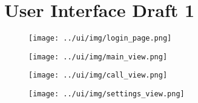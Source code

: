 \chapter{User Interface Draft 1}
\begin{landscape}
	\begin{figure}[H]
		\centering
		\texttt{[image: ../ui/img/login\_page.png]}
		\label{login screen}
	\end{figure}
	\begin{figure}[H]
		\centering
		\texttt{[image: ../ui/img/main\_view.png]}
		\label{main screen}
	\end{figure}
	\begin{figure}[H]
		\centering
		\texttt{[image: ../ui/img/call\_view.png]}
		\label{call screen}
	\end{figure}
	\begin{figure}[H]
		\centering
		\texttt{[image: ../ui/img/settings\_view.png]}
		\label{settings screen}
	\end{figure}
\end{landscape} 
